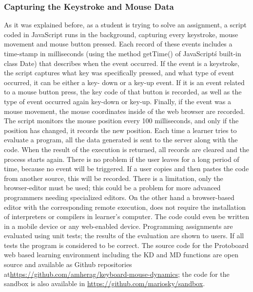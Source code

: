\documentclass[a4paper,twoside]{article}
\begin{document}
\subsubsection{Capturing the Keystroke and Mouse Data}
As it was explained before, as a student is trying to solve an assignment,
a script coded in JavaScript runs in the background,
capturing every keystroke, mouse movement and mouse button pressed. Each record
of these events includes a time-stamp in milliseconds (using the method
getTime() of JavaScript\'s built-in class Date) that describes when the event
occurred. If the event is a keystroke, the script captures what key was
specifically pressed, and what type of event occurred, it can be either a key-
down or a key-up event. If it is an event related to a mouse button press, the
key code of that button is recorded, as well as the type of event occurred again
key-down or key-up. Finally, if the event was a mouse movement, the mouse
coordinates inside of the web browser are recorded. The script monitors the
mouse position every 100 milliseconds, and only if the position has changed, it
records the new position. Each time a learner tries to evaluate a program, all
the data generated is sent to the server along with the code. When the result of
the execution is returned, all records are cleared and the process starts again.
There is no problem if the user leaves for a long period of time, because no
event will be triggered. If a user copies and then pastes the code from another
source, this will be recorded. There is a limitation, only the browser-editor
must be used; this could be a problem for more advanced programmers needing
specialized editors.  On the other hand a browser-based editor with the
corresponding remote execution, does not require the installation of
interpreters or compilers in learner’s computer. The code could even be written
in a mobile device or any web-enabled device. Programming assignments are
evaluated using unit tests; the results of the evaluation are shown to users.
If all tests the program is considered to be correct. The source code for the
Protoboard web based learning environment including the KD and MD functions are
open source and available as Github repositories
at\url{https://github.com/amherag/keyboard-mouse-dynamics}; the code for the
sandbox is also available in \url{https://github.com/mariosky/sandbox}.
\end{document}
